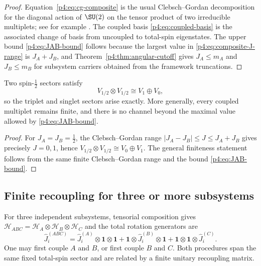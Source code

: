 \documentclass[12pt,a4paper]{article}
\begin{document}
\begin{proof}
Equation~\eqref{p4:eq:cg-composite} is the usual Clebsch--Gordan decomposition for the diagonal action of \(\SU(2)\) on the tensor product of two irreducible multiplets; see for example \cite{Hall2015lie}.
The coupled basis \eqref{p4:eq:coupled-basis} is the associated change of basis from uncoupled to total-spin eigenstates.
The upper bound \eqref{p4:eq:JAB-bound} follows because the largest value in \eqref{p4:eq:composite-J-range} is \(J_A+J_B\), and Theorem~\ref{p4:thm:angular-cutoff} gives \(J_A\le m_A\) and \(J_B\le m_B\) for subsystem carriers obtained from the framework truncations.
\end{proof}

\begin{corollary}
\label{p4:cor:singlet-triplet}
Two spin-\(\tfrac12\) sectors satisfy
\begin{equation}
\label{p4:eq:half-half}
V_{1/2}\otimes V_{1/2}
\cong
V_1\oplus V_0,
\end{equation}
so the triplet and singlet sectors arise exactly.
More generally, every coupled multiplet remains finite, and there is no channel beyond the maximal value allowed by \eqref{p4:eq:JAB-bound}.
\end{corollary}

\begin{proof}
For \(J_A=J_B=\tfrac12\), the Clebsch--Gordan range \(|J_A-J_B|\le J\le J_A+J_B\) gives precisely \(J=0,1\), hence \(V_{1/2}\otimes V_{1/2}\cong V_0\oplus V_1\).  The general finiteness statement follows from the same finite Clebsch--Gordan range and the bound \eqref{p4:eq:JAB-bound}.
\end{proof}




\subsection{Finite recoupling for three or more subsystems}
\label{p4:sec:part2-recoupling}

For three independent subsystems, tensorial composition gives
\(
\mathcal H_{ABC}=\mathcal H_A\otimes\mathcal H_B\otimes\mathcal H_C
\)
and the total rotation generators are
\begin{equation}
\label{p4:eq:Jtot-ABC}
\hat J_i^{(ABC)}
=
\hat J_i^{(A)}\otimes\mathbf 1\otimes\mathbf 1
+
\mathbf 1\otimes\hat J_i^{(B)}\otimes\mathbf 1
+
\mathbf 1\otimes\mathbf 1\otimes\hat J_i^{(C)}.
\end{equation}
One may first couple \(A\) and \(B\), or first couple \(B\) and \(C\).
Both procedures span the same fixed total-spin sector and are related by a finite unitary recoupling matrix.
\end{document}
